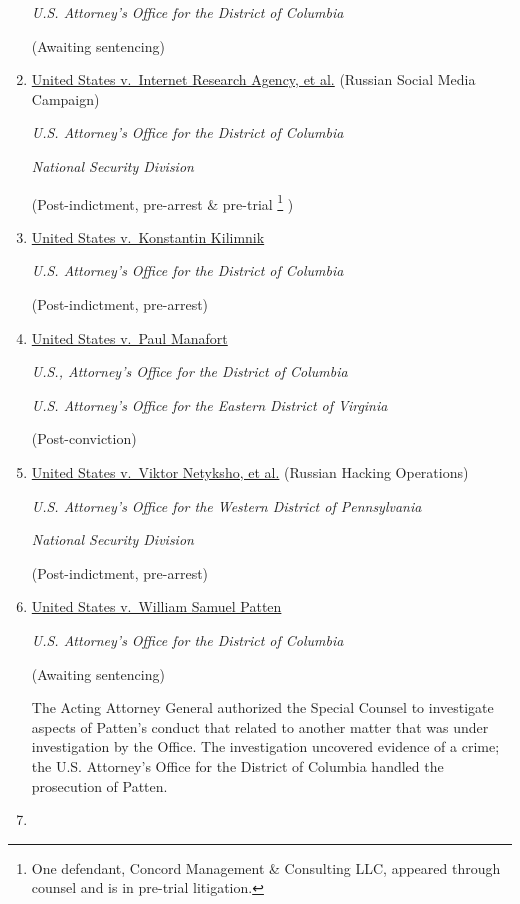 \begin{enumerate}[1.]
\textit{U.S. Attorney's Office for the District of Columbia}

(Awaiting sentencing)

    \item \underline{United States v.\ Internet Research Agency, et al.} (Russian Social Media Campaign)

\textit{U.S. Attorney’s Office for the District of Columbia}

\textit{National Security Division}

(Post-indictment, pre-arrest \& pre-trial%
\footnote{One defendant, Concord Management \& Consulting LLC, appeared through counsel and is in pre-trial litigation.}
)

    \item \underline{United States v.\ Konstantin Kilimnik}

\textit{U.S. Attorney’s Office for the District of Columbia}

(Post-indictment, pre-arrest)

    \item \underline{United States v.\ Paul Manafort}

\textit{U.S., Attorney's Office for the District of Columbia}

\textit{U.S. Attorney’s Office for the Eastern District of Virginia}

(Post-conviction)

    \item \underline{United States v.\ Viktor Netyksho, et al.} (Russian Hacking Operations)

\textit{U.S. Attorney’s Office for the Western District of Pennsylvania}

\textit{National Security Division}

(Post-indictment, pre-arrest)

    \item \underline{United States v.\ William Samuel Patten}

\textit{U.S. Attorney's Office for the District of Columbia}

(Awaiting sentencing)

The Acting Attorney General authorized the Special Counsel to investigate aspects of Patten’s conduct that related to another matter that was under investigation by the Office.
The investigation uncovered evidence of a crime; the U.S. Attorney’s Office for the District of Columbia handled the prosecution of Patten.

    \item \underline{}


\end{enumerate}
